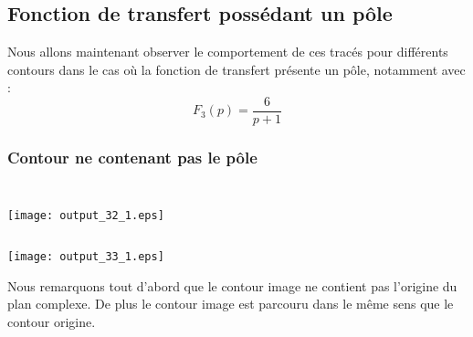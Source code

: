 \subsection{Fonction de transfert possédant un pôle}
Nous allons maintenant observer le comportement de ces tracés pour différents
contours dans le cas où la fonction de transfert présente un pôle,
notamment avec :
\[
F_3(p)=\dfrac{6}{p+1}
\] 
\subsubsection{Contour ne contenant pas le pôle}
\begin{tcolorbox}[breakable, size=fbox, boxrule=1pt, pad at break*=1mm,colback=cellbackground, colframe=cellborder]
\inputminted{python}{codes/python/annexe_cauchy_cellule12.py}
\end{tcolorbox}
\begin{tcolorbox}[breakable, size=fbox, boxrule=1pt, pad at break*=1mm,colback=cellbackground, colframe=cellborder]
\inputminted{python}{codes/python/annexe_cauchy_cellule13.py}
\end{tcolorbox}
\begin{center}
    \texttt{[image: output\_32\_1.eps]}
\end{center}
\begin{tcolorbox}[breakable, size=fbox, boxrule=1pt, pad at break*=1mm,colback=cellbackground, colframe=cellborder]
\inputminted{python}{codes/python/annexe_cauchy_cellule14.py}
\end{tcolorbox}
\begin{center}
    \texttt{[image: output\_33\_1.eps]}
\end{center}
Nous remarquons tout d'abord que le contour image ne contient pas
l'origine du plan complexe. De plus le contour image est parcouru dans
le même sens que le contour origine. 
